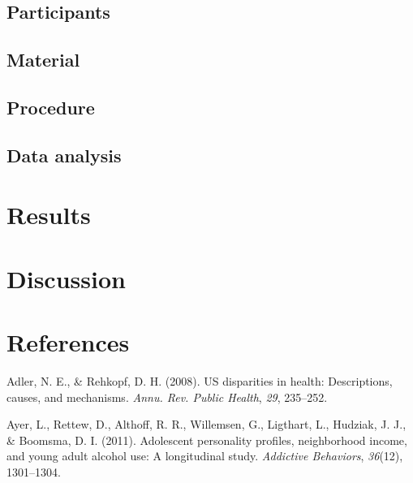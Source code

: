 \documentclass[man]{apa6}
\begin{document}
\hypertarget{participants}{%
\subsection{Participants}\label{participants}}

\hypertarget{material}{%
\subsection{Material}\label{material}}

\hypertarget{procedure}{%
\subsection{Procedure}\label{procedure}}

\hypertarget{data-analysis}{%
\subsection{Data analysis}\label{data-analysis}}

\hypertarget{results}{%
\section{Results}\label{results}}

\hypertarget{discussion}{%
\section{Discussion}\label{discussion}}

\newpage

\hypertarget{references}{%
\section{References}\label{references}}

\begingroup
\setlength{\parindent}{-0.5in}
\setlength{\leftskip}{0.5in}

\hypertarget{refs}{}
\leavevmode\hypertarget{ref-adler2008us}{}%
Adler, N. E., \& Rehkopf, D. H. (2008). US disparities in health: Descriptions, causes, and mechanisms. \emph{Annu. Rev. Public Health}, \emph{29}, 235--252.

\leavevmode\hypertarget{ref-ayer2011adolescent}{}%
Ayer, L., Rettew, D., Althoff, R. R., Willemsen, G., Ligthart, L., Hudziak, J. J., \& Boomsma, D. I. (2011). Adolescent personality profiles, neighborhood income, and young adult alcohol use: A longitudinal study. \emph{Addictive Behaviors}, \emph{36}(12), 1301--1304.
\end{document}
